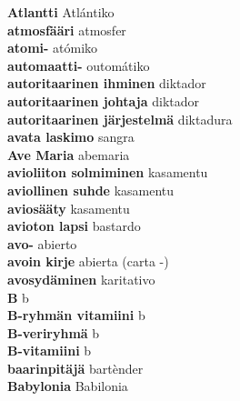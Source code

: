 \textbf{ Atlantti  } Atlántiko \\
\textbf{ atmosfääri  } atmosfer \\
\textbf{ atomi-  } atómiko \\
\textbf{ automaatti-  } outomátiko \\
\textbf{ autoritaarinen ihminen  } diktador \\
\textbf{ autoritaarinen johtaja  } diktador \\
\textbf{ autoritaarinen järjestelmä  } diktadura \\
\textbf{ avata laskimo  } sangra \\
\textbf{ Ave Maria  } abemaria \\
\textbf{ avioliiton solmiminen  } kasamentu \\
\textbf{ aviollinen suhde  } kasamentu \\
\textbf{ aviosääty  } kasamentu \\
\textbf{ avioton lapsi  } bastardo \\
\textbf{ avo-  } abierto \\
\textbf{ avoin kirje  } abierta (carta -) \\
\textbf{ avosydäminen  } karitativo \\
\textbf{ B  } b \\
\textbf{ B-ryhmän vitamiini  } b \\
\textbf{ B-veriryhmä  } b \\
\textbf{ B-vitamiini  } b \\
\textbf{ baarinpitäjä  } bartènder \\
\textbf{ Babylonia  } Babilonia \\
